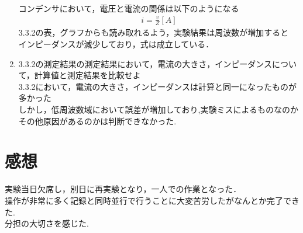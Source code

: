 \documentclass[titlepage]{jarticle}
\begin{document}
\begin{enumerate}
          コンデンサにおいて，電圧と電流の関係は以下のようになる
          \begin{eqnarray}
              i=\frac{v}{Z} [A]
          \end{eqnarray}
          3.3.2の表，グラフからも読み取れるよう，実験結果は周波数が増加すると\\
          インピーダンスが減少しており，式は成立している．
    \item 3.3.2の測定結果の測定結果において，電流の大きさ，インピーダンスについて，計算値と測定結果を比較せよ\\
          3.3.2において，電流の大きさ，インピーダンスは計算と同一になったものが多かった\\
          しかし，低周波数域において誤差が増加しており,実験ミスによるものなのか\\
          その他原因があるのかは判断できなかった.
\end{enumerate}


\section{感想}
実験当日欠席し，別日に再実験となり，一人での作業となった．\\
操作が非常に多く記録と同時並行で行うことに大変苦労したがなんとか完了できた.\\
分担の大切さを感じた.
\end{document}
